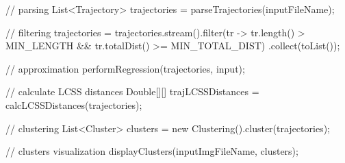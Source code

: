 // parsing
List<Trajectory> trajectories = parseTrajectories(inputFileName);

// filtering
trajectories = trajectories.stream().filter(tr -> 
		tr.length() > MIN_LENGTH && tr.totalDist() >= MIN_TOTAL_DIST)
	.collect(toList());

// approximation
performRegression(trajectories, input);

// calculate LCSS distances
Double[][] trajLCSSDistances = calcLCSSDistances(trajectories);

// clustering
List<Cluster> clusters = new Clustering().cluster(trajectories);

// clusters visualization
displayClusters(inputImgFileName, clusters);